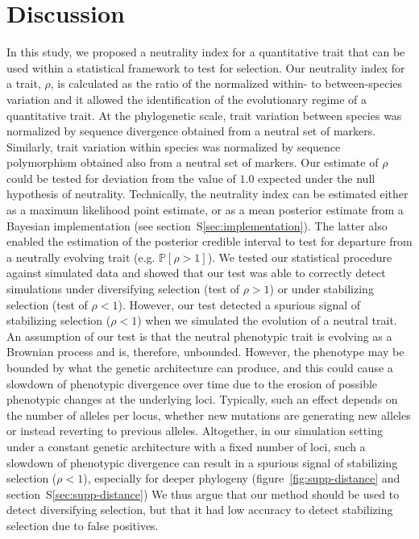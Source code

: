 \documentclass{article}
\newcommand{\proba}{\mathbb{P}}
\newcommand{\NI}{\rho}
\begin{document}
\section*{Discussion}\label{sec:discussion}

In this study, we proposed a neutrality index for a quantitative trait that can be used within a statistical framework to test for selection.
Our neutrality index for a trait, $\NI$, is calculated as the ratio of the normalized within- to between-species variation and it allowed the identification of the evolutionary regime of a quantitative trait.
At the phylogenetic scale, trait variation between species was normalized by sequence divergence obtained from a neutral set of markers.
Similarly, trait variation within species was normalized by sequence polymorphism obtained also from a neutral set of markers.
Our estimate of $\NI$ could be tested for deviation from the value of $1.0$ expected under the null hypothesis of neutrality.
Technically, the neutrality index can be estimated either as a maximum likelihood point estimate, or as a mean posterior estimate from a Bayesian implementation (see section~S\ref{sec:implementation}).
The latter also enabled the estimation of the posterior credible interval to test for departure from a neutrally evolving trait (e.g. $ \proba [ \NI > 1 ]$).
We tested our statistical procedure against simulated data and showed that our test was able to correctly detect simulations under diversifying selection (test of $\NI > 1$) or under stabilizing selection (test of $\NI < 1$).
However, our test detected a spurious signal of stabilizing selection ($\NI < 1$) when we simulated the evolution of a neutral trait.
An assumption of our test is that the neutral phenotypic trait is evolving as a Brownian process and is, therefore, unbounded.
However, the phenotype may be bounded by what the genetic architecture can produce, and this could cause a slowdown of phenotypic divergence over time due to the erosion of possible phenotypic changes at the underlying loci.
Typically, such an effect depends on the number of alleles per locus, whether new mutations are generating new alleles or instead reverting to previous alleles.
Altogether, in our simulation setting under a constant genetic architecture with a fixed number of loci, such a slowdown of phenotypic divergence can result in a spurious signal of stabilizing selection ($\NI < 1$), especially for deeper phylogeny (figure~\ref{fig:supp-distance} and section~S\ref{sec:supp-distance})
We thus argue that our method should be used to detect diversifying selection, but that it had low accuracy to detect stabilizing selection due to false positives.
\end{document}
